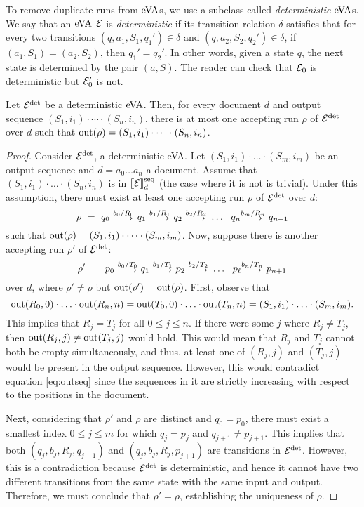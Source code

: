 To remove duplicate runs from $\mathrm{eVA}$s, we use a subclass called
\emph{deterministic} $\mathrm{eVA}$s. We say that an $\mathrm{eVA}$ $\mathcal{E}$ is
\emph{deterministic} if its transition relation $\delta$ satisfies that for
every two transitions $(q, a_1, S_1, q_1') \in \delta$ and $(q, a_2, S_2, q_2')
\in \delta$, if $(a_1, S_1) = (a_2, S_2)$, then $q_1' = q_2'$. In other words,
given a state $q$, the next state is determined by the pair $(a, S)$. The reader
can check that $\mathcal{E}_0$ is deterministic but $\mathcal{E}_0'$ is not.
\begin{proposition} \label{prop:determinization} Let $\mathcal{E}^{{\operatorname{det}}}$ be a
	deterministic $\mathrm{eVA}$. Then, for every document $d$ and output sequence
	$(S_1, i_1)\cdot \cdots \cdot(S_n, i_n)$, there is at most one accepting run
	$\rho$ of $\mathcal{E}^{{\operatorname{det}}}$ over $d$ such that $\operatorname{out}(\rho) = (S_1, i_1)\cdot
	\cdots \cdot(S_n, i_n)$.
\end{proposition}
\begin{proof}
	Consider $\mathcal{E}^{{\operatorname{det}}}$, a deterministic eVA. Let $(S_1, i_1)\cdot \ldots
	\cdot (S_m, i_m)$ be an output sequence and $d = a_0\ldots a_n$ a document.
	Assume that $(S_1, i_1)\cdot \ldots \cdot (S_n, i_n)$ is in $\llbracket\mathcal{E}\rrbracket^{\operatorname{seq}}_d$
	(the case where it is not is trivial). Under this assumption, there must
	exist at least one accepting run $\rho$ of $\mathcal{E}^{{\operatorname{det}}}$ over $d$:
$$
\rho \ = \ q_0 \ \longtrans{b_0 / R_0} \ q_1 \ \longtrans{b_1 / R_1} \ q_2 \ \longtrans{b_2 / R_2} \ \ldots \ \ q_{n} \longtrans{b_{m} / R_n} \ q_{n+1}
$$
such that $\operatorname{out}(\rho) = (S_1, i_1)\cdot \cdots \cdot (S_m, i_m)$. Now, suppose
there is another accepting run $\rho'$ of $\mathcal{E}^{{\operatorname{det}}}$:
$$
\rho' \ = \ p_0 \ \longtrans{b_0 / T_0} \ q_1 \ \longtrans{b_1 / T_1} \ p_2 \ \longtrans{b_2 / T_2} \ \ldots \ \ p_{\ell} \longtrans{b_n / T_n} \ p_{n+1}
$$
over $d$, where $\rho' \neq \rho$ but $\operatorname{out}(\rho') = \operatorname{out}(\rho)$. First,
observe that
\begin{equation} \label{eq:outseq}
\operatorname{out}(R_0, 0)\cdot \ldots \cdot \operatorname{out}(R_n, n) = \operatorname{out}(T_0, 0)\cdot \ldots \cdot \operatorname{out}(T_n, n) = (S_1, i_1)\cdot \ldots \cdot (S_m, i_m).
\end{equation}
This implies that $R_j = T_j$ for all $0 \leq j \leq n$. If there were some $j$
where $R_j \neq T_j$, then $\operatorname{out}(R_j, j) \neq \operatorname{out}(T_j, j)$ would hold. This
would mean that $R_j$ and $T_j$ cannot both be empty simultaneously, and thus,
at least one of $(R_j, j)$ and $(T_j, j)$ would be present in the output
sequence. However, this would contradict equation \eqref{eq:outseq} since the
sequences in it are strictly increasing with respect to the positions in the
document.

Next, considering that $\rho'$ and $\rho$ are distinct and $q_0 = p_0$, there
must exist a smallest index $0 \leq j \leq m$ for which $q_j = p_j$ and $q_{j+1}
\neq p_{j+1}$. This implies that both $(q_j, b_j, R_j, q_{j+1})$ and $(q_j, b_j,
R_j, p_{j+1})$ are transitions in $\mathcal{E}^{\operatorname{det}}$. However, this is a contradiction
because $\mathcal{E}^{{\operatorname{det}}}$ is deterministic, and hence it cannot have two different
transitions from the same state with the same input and output. Therefore, we
must conclude that $\rho' = \rho$, establishing the uniqueness of $\rho$.
\end{proof}

